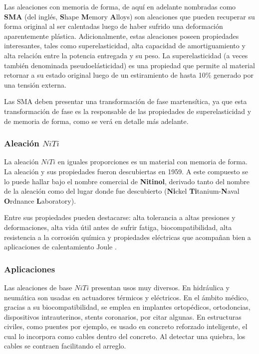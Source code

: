 \documentclass[12pt]{article}
\theoremstyle{definition}
\theoremstyle{remark}
\begin{document}
Las aleaciones con memoria de forma, de aquí en adelante nombradas como \textbf{SMA} (del inglés, \textbf{S}hape \textbf{M}emory \textbf{A}lloys) son aleaciones que pueden recuperar su forma original al ser calentadas luego de haber sufrido una deformación aparentemente plástica. Adicionalmente, estas aleaciones poseen propiedades interesantes, tales como superelasticidad, alta capacidad de amortiguamiento y alta relación entre la potencia entregada y su peso. La superelasticidad (a veces también denominada pseudoelásticidad) es una propiedad que permite al material retornar a su estado original luego de un estiramiento de hasta 10\% generado por una tensión externa\cite{Rubber}.

Las SMA deben presentar una transformación de fase martensítica, ya que esta transformación de fase es la responsable de las propiedades de superelasticidad y de memoria de forma, como se verá en detalle más adelante.

\subsubsection{Aleación $NiTi$}\label{aleation}
La aleación $NiTi$ en iguales proporciones es un material con memoria de forma. La aleación y sus propiedades fueron descubiertas en 1959. A este compuesto se lo puede hallar bajo el nombre comercial de \textbf{Nitinol}, derivado tanto del nombre de la aleación como del lugar donde fue descubierto (\textbf{Ni}ckel \textbf{Ti}tanium-\textbf{N}aval \textbf{O}rdnance \textbf{L}aboratory)\cite{Story}. 

Entre sus propiedades pueden destacarse: alta tolerancia a altas presiones y deformaciones, alta vida útil antes de sufrir fatiga, biocompatibilidad, alta resistencia a la corrosión química y propiedades eléctricas que acompañan bien a aplicaciones de calentamiento Joule \cite{ThinFilm}.

\subsubsection{Aplicaciones}
Las aleaciones de base $NiTi$ presentan usos muy diversos. En hidráulica y neumática son usadas en actuadores térmicos y eléctricos. En el ámbito médico, gracias a su biocompatibilidad, se emplea en implantes ortopédicos, ortodoncias, dispositivos intrauterinos, stents coronarios, por citar algunas. En estructuras civiles, como puentes por ejemplo, es usado en concreto reforzado inteligente, el cual lo incorpora como cables dentro del concreto. Al detectar una quiebra, los cables se contraen facilitando el arreglo\cite{Engineering}.
\end{document}
